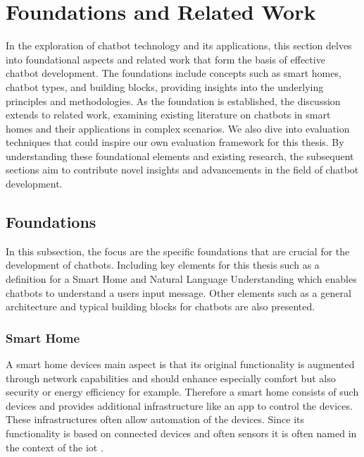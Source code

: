 
\chapter{Foundations and Related Work}
\label{chap:ch2}
\label{chap:foundation}

In the exploration of chatbot technology and its applications, this section delves into foundational aspects and related work that form the basis of effective chatbot development. 
The foundations include concepts such as smart homes, chatbot types, and building blocks, providing insights into the underlying principles and methodologies. 
As the foundation is established, the discussion extends to related work, examining existing literature on chatbots in smart homes and their applications in complex scenarios.
We also dive into evaluation techniques that could inspire our own evaluation framework for this thesis. 
By understanding these foundational elements and existing research, the subsequent sections aim to contribute novel insights and advancements in the field of chatbot development.

\section{Foundations}
\label{sec:foundation}
In this subsection, the focus are the specific foundations that are crucial for the development of chatbots.
Including key elements for this thesis such as a definition for a Smart Home and Natural Language Understanding which enables chatbots to understand a users input message.
Other elements such as a general architecture and typical building blocks for chatbots are also presented.

\subsection{Smart Home} 
A smart home devices main aspect is that its original functionality is augmented through network capabilities \cite{schiefer_smart_2015,balakrishnan_smart_2018} and should enhance especially comfort \cite{matsui_information_2018, balakrishnan_smart_2018} but also security \cite{balakrishnan_smart_2018} or energy efficiency \cite{matsui_information_2018, balakrishnan_smart_2018} for example. 
Therefore a smart home consists of such devices and provides additional infrastructure like an app to control the devices. 
These infrastructures often allow automation of the devices.
Since its functionality is based on connected devices and often sensors it is often named in the context of the \gls{iot} \cite{atzori_internet_2010}. 


